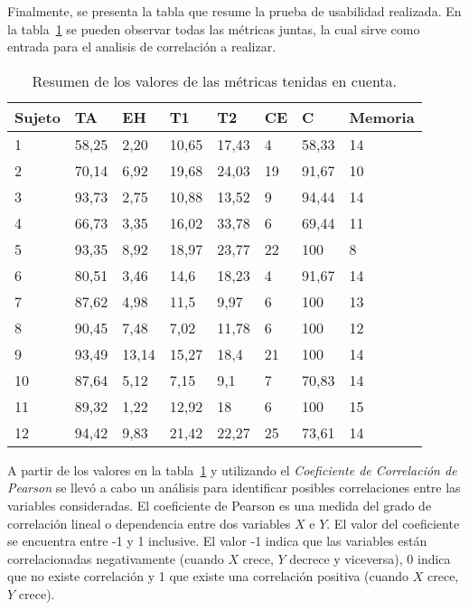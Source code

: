 Finalmente, se presenta la tabla que resume la prueba de usabilidad realizada. En la tabla~\ref{sec:tabla-resumen-prueba}
se pueden observar todas las m\'etricas juntas, la cual sirve como entrada para el analisis de correlaci\'on a realizar.

\begin{table}[H]
\centering
\footnotesize
\begin{tabular}{|p{1.6cm}|p{1.6cm}|p{1.6cm}|p{1.6cm}|p{1.6cm}|p{1.6cm}|p{1.6cm}|p{1.6cm}|}
\hline
    Sujeto & TA    &    EH & T1    & T2  & CE &  C    & Memoria \\
    \hline 
    1      & 58,25 & 2,20  & 10,65 & 17,43 & 4  & 58,33 & 14 \\
    2      & 70,14 & 6,92  & 19,68 & 24,03 & 19 & 91,67 & 10 \\
    3      & 93,73 & 2,75  & 10,88 & 13,52 & 9  & 94,44 & 14 \\
    4      & 66,73 & 3,35  & 16,02 & 33,78 & 6  & 69,44 & 11 \\
    5      & 93,35 & 8,92  & 18,97 & 23,77 & 22 & 100   & 8  \\
    6      & 80,51 & 3,46  & 14,6  & 18,23 & 4  & 91,67 & 14 \\
    7      & 87,62 & 4,98  &  11,5 & 9,97  & 6  & 100   & 13 \\
    8      & 90,45 & 7,48  & 7,02  & 11,78 & 6  & 100   & 12 \\
    9      & 93,49 & 13,14 & 15,27 & 18,4  & 21 & 100   & 14 \\
    10     & 87,64 & 5,12  & 7,15  & 9,1   & 7  & 70,83 & 14 \\
    11     & 89,32 & 1,22  & 12,92 & 18    & 6  & 100   & 15 \\
    12     & 94,42 & 9,83  & 21,42 & 22,27 & 25 & 73,61 & 14 \\
\hline
\end{tabular}
\caption{Resumen de los valores de las métricas tenidas en cuenta.}
\label{sec:tabla-resumen-prueba}
\end{table}

A partir de los valores en la tabla~\ref{sec:tabla-resumen-prueba} y utilizando el \emph{Coeficiente de 
Correlaci\'on de Pearson}\cite{BoslaughStatistics2008} se llev\'o a cabo un an\'alisis  para identificar posibles
correlaciones entre las variables consideradas. El coeficiente de Pearson es una medida del grado de 
correlaci\'on lineal o dependencia entre dos variables $X$ e $Y$. El valor del coeficiente se encuentra entre
-1 y 1 inclusive. El valor -1 indica que las variables est\'an correlacionadas negativamente 
(cuando $X$ crece, $Y$ decrece y viceversa), 0 indica que no existe correlaci\'on y 1 que existe una correlaci\'on
positiva (cuando $X$ crece, $Y$ crece).


